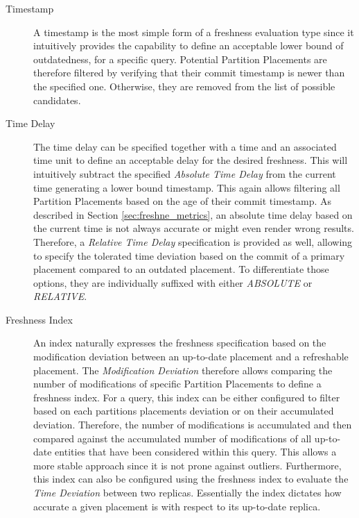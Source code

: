 \begin{description}
    \item[Timestamp] A timestamp is the most simple form of a freshness evaluation type since it intuitively provides the capability to define 
    an acceptable lower bound of outdatedness, for a specific query. Potential Partition Placements are therefore filtered by verifying that their commit timestamp is newer
    than the specified one. Otherwise, they are removed from the list of possible candidates.
    
    \item[Time Delay]
    The time delay can be specified together with a time and an associated time unit to define an acceptable delay for the desired freshness. 
    This will intuitively subtract the specified \emph{Absolute Time Delay} from the current time generating a lower bound timestamp. 
    This again allows filtering all Partition Placements based on the age of their commit timestamp.
    As described in Section \ref{sec:freshne_metrics}, an absolute time delay based on the current time is not always accurate or might even render wrong results.
    Therefore, a \emph{Relative Time Delay} specification is provided as well, allowing to specify the tolerated time deviation based on the commit of a primary placement 
    compared to an outdated placement. To differentiate those options, they are individually suffixed with either \emph{ABSOLUTE} or  \emph{RELATIVE}.

    \item[Freshness Index]
    An index naturally expresses the freshness specification based on the modification deviation between an up-to-date placement
    and a refreshable placement. The \emph{Modification Deviation} therefore allows comparing the number of modifications of specific Partition Placements
    to define a freshness index. For a query, this index can be either configured to filter based on each partitions placements deviation or on their accumulated deviation.
    Therefore, the number of modifications is accumulated and then compared against the accumulated number of modifications 
    of all up-to-date entities that have been considered within this query. This allows a more stable approach since it is not prone against outliers. 
    Furthermore, this index can also be configured using the freshness index to evaluate the \emph{Time Deviation} between two replicas. 
    Essentially the index dictates how accurate a given placement is with respect to its up-to-date replica.
    
\end{description}

